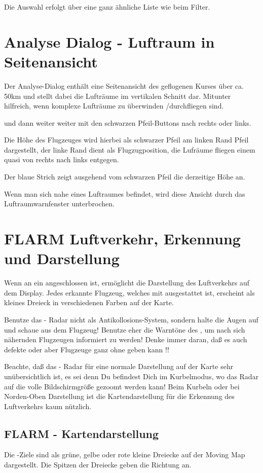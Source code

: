  Die Auswahl erfolgt über eine ganz ähnliche Liste wie beim Filter. 


\section{Analyse  Dialog - Luftraum in Seitenansicht}
Der Analyse-Dialog enthält eine Seitenansicht des geflogenen Kurses über ca. 50km und stellt
dabei die Lufträume im vertikalen Schnitt dar.
Mitunter hilfreich, wenn komplexe Lufträume zu überwinden /durchfliegen sind.

und dann weiter weiter mit den schwarzen Pfeil-Buttons  nach rechts oder links.

Die Höhe des Flugzeuges wird hierbei als schwarzer Pfeil am linken Rand Pfeil dargestellt, der linke
Rand dient als Flugzugposition, die Lufräume fliegen einem quasi von rechts nach links entgegen.

Der blaue Strich zeigt ausgehend vom schwarzen Pfeil die derzeitige Höhe an.

Wenn man sich nahe eines Luftraumes befindet, wird diese Ansicht durch das
Luftraumwarnfenster unterbrochen.


\section{FLARM Luftverkehr, Erkennung und Darstellung}
Wenn \xc an ein \fl angeschlossen ist, ermöglicht \xc die Darstellung
des Luftverkehrs auf dem Display. Jedes erkannte Flugzeug, welches mit \fl
ausgestattet ist,  erscheint als kleines Dreieck in verschiedenen Farben  auf der Karte.

\achtung Benutze das \xc \fl- Radar nicht als Antikollosions-System, sondern halte die Augen auf und schaue
aus dem Flugzeug! Benutze eher die Warntöne des \fl , um nach sich nähernden Flugzeugen informiert zu werden!
Denke immer daran, daß es auch defekte \fl oder aber Flugzeuge ganz ohne \fl geben kann !!

Beachte, daß das \fl- Radar für eine normale Darstellung auf der Karte sehr unübersichtlich ist, es sei denn
Du befindest Dich im Kurbelmodus, wo das Radar auf die volle Bildschirmgröße gezoomt werden kann!
Beim Kurbeln oder bei Norden-Oben Darstellung ist die Kartendarstellung für die Erkennung des Luftverkehrs
kaum nützlich.

\subsection*{FLARM - Kartendarstellung}
Die \fl-Ziele sind als grüne, gelbe  oder rote kleine Dreiecke auf der Moving Map dargestellt.
Die Spitzen der Dreiecke geben die Richtung an.

